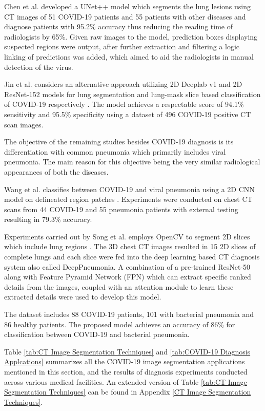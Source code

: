 Chen et al. developed a UNet++ model which segments the lung lesions 
\cite{CJL+2020} using CT images of 51 COVID-19 patients and 
55 patients with other diseases and diagnose patients with 95.2\% accuracy thus reducing the reading time of radiologists by 65\%. Given 
raw images to the model, prediction boxes displaying suspected regions were output,
after further extraction and filtering a logic linking of predictions was added, which 
aimed to aid the radiologists in manual detection of the virus.

Jin et al. considers an alternative approach  
utilizing 2D Deeplab v1 and 2D ResNet-152 models for lung segmentation 
and lung-mask slice based classification of COVID-19 respectively \cite{JCW+2020}. The 
model achieves a respectable score of 94.1\% sensitivity and 95.5\% 
specificity using a dataset of 496 COVID-19 positive CT scan images.

The objective of the remaining studies besides COVID-19 diagnosis is its differentiation
with common pneumonia which primarily 
includes viral pneumonia. The main reason for this objective being the 
very similar radiological appearances of both the diseases.

Wang et al. classifies between COVID-19 and viral pneumonia using a 2D CNN model on delineated 
region patches \cite{WBX+2020}. Experiments were conducted on chest CT scans from 
44 COVID-19 and 55 pneumonia patients with external testing 
resulting in 79.3\% accuracy.

Experiments carried out by Song et al. employs OpenCV to segment 
2D slices which include lung regions \cite{SZL+2020}. The 3D chest CT images resulted in 
15 2D slices of complete lungs and each slice were fed into the deep learning based CT diagnosis system also called DeepPneumonia. A combination of 
a pre-trained ResNet-50 along with Feature Pyramid Network (FPN) which can 
extract specific ranked details from the images, coupled 
with an attention module to learn these extracted details were used to develop this model.

The dataset includes 88 COVID-19 patients, 101 with bacterial pneumonia and 86 
healthy patients. The proposed model achieves an accuracy of 86\% for classification 
between COVID-19 and bacterial pneumonia.

Table \ref{tab:CT Image Segmentation Techniques} and \ref{tab:COVID-19 Diagnosis Applcations} summarizes all the COVID-19 image segmentation 
applications mentioned in this section,
and the results of diagnosis experiments conducted across various 
medical facilities. An extended version of Table \ref{tab:CT Image Segmentation Techniques} can be found in Appendix \ref{CT Image Segmentation Techniques}.
\vspace{1em}

